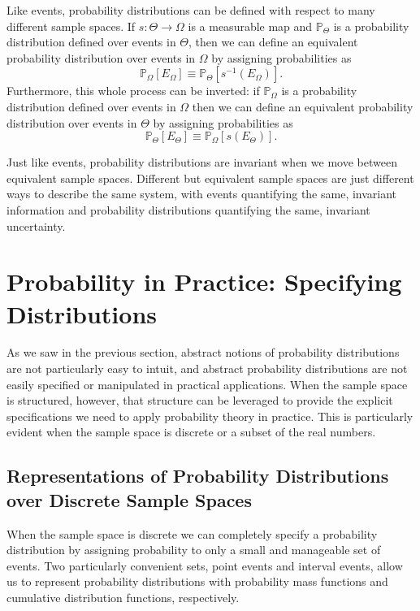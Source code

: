 \documentclass[11pt, oneside]{article}
\newcommand{\PP}{ \mathbb{P} }
\begin{document}
Like events, probability distributions can be defined with respect
to many different sample spaces.  If $s : \Theta \rightarrow 
\Omega$ is a measurable map and $\PP_{\Theta}$ is a probability
distribution defined over events in $\Theta$, then we can define an 
equivalent probability distribution over events in $\Omega$ by 
assigning probabilities as
%
\begin{equation*}
\PP_{\Omega} \! \left[ E_{\Omega} \right]
\equiv
\PP_{\Theta} \! \left[ s^{-1} \! \left( E_{\Omega} \right) \right].
\end{equation*}
%
Furthermore, this whole process can be inverted: if $\PP_{\Omega}$ 
is a probability distribution defined over events in $\Omega$ then 
we can define an equivalent probability distribution over events in 
$\Theta$ by assigning probabilities as
%
\begin{equation*}
\PP_{\Theta} \! \left[ E_{\Theta} \right]
\equiv
\PP_{\Omega} \! \left[ s \! \left( E_{\Theta} \right) \right].
\end{equation*}

Just like events, probability distributions are invariant when we
move between equivalent sample spaces.  Different but equivalent
sample spaces are just different ways to describe the same system,
with events quantifying the same, invariant information and probability 
distributions quantifying the same, invariant uncertainty.

\section{Probability in Practice: Specifying Distributions}

As we saw in the previous section, abstract notions of probability
distributions are not particularly easy to intuit, and abstract
probability distributions are not easily specified or manipulated
in practical applications.  When the sample space is structured, 
however, that structure can be leveraged to provide the explicit 
specifications we need to apply probability theory in practice.  
This is particularly evident when the sample space is discrete 
or a subset of the real numbers.

\subsection{Representations of Probability Distributions over
Discrete Sample Spaces}

When the sample space is discrete we can completely specify a
probability distribution by assigning probability to only a small
and manageable set of events.  Two particularly convenient sets,
point events and interval events, allow us to represent probability
distributions with probability mass functions and cumulative 
distribution functions, respectively.  
\end{document}
